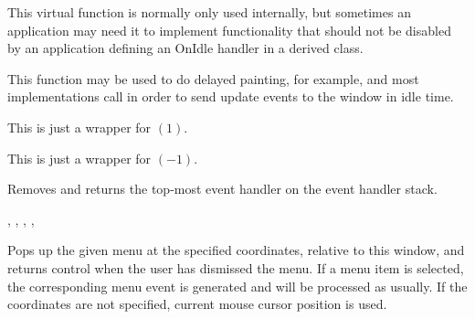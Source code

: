 \label{wxwindowoninternalidle}


This virtual function is normally only used internally, but
sometimes an application may need it to implement functionality
that should not be disabled by an application defining an OnIdle
handler in a derived class.

This function may be used to do delayed painting, for example,
and most implementations call 
in order to send update events to the window in idle time.


\label{wxwindowpagedown}

This is just a wrapper for $(1)$.


\label{wxwindowpageup}

This is just a wrapper for $(-1)$.


\label{wxwindowpopeventhandler}


Removes and returns the top-most event handler on the event handler stack.




,\rtfsp
{},\rtfsp
{},\rtfsp
{},\rtfsp
{}\rtfsp


\label{wxwindowpopupmenu}



Pops up the given menu at the specified coordinates, relative to this
window, and returns control when the user has dismissed the menu. If a
menu item is selected, the corresponding menu event is generated and will be
processed as usually. If the coordinates are not specified, current mouse
cursor position is used.

